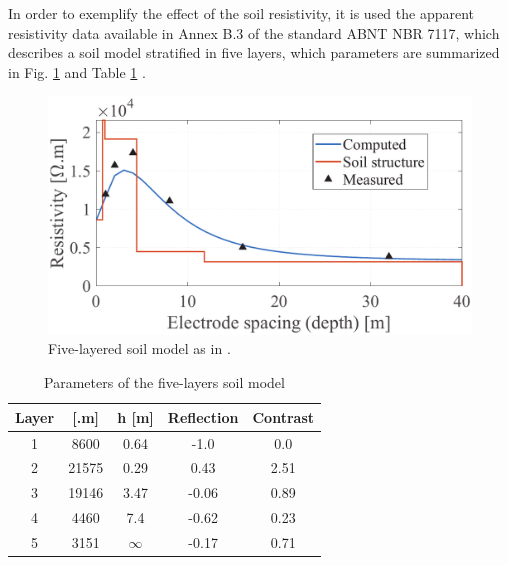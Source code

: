 \documentclass[conference]{IEEEtran}
\begin{document}
	In order to exemplify the effect of the soil resistivity, it is used the apparent resistivity data available in Annex B.3 of the standard ABNT NBR 7117, which describes a soil model stratified in five layers, which parameters are summarized in Fig. \ref{fig:SoilModel} and Table \ref{table:SoilParams} \cite{NBR7117}.
	
	\begin{figure}[hbt]
		\begin{center}
			\includegraphics[width=.8\columnwidth]{fig/soilmodel2.pdf}
			\caption{Five-layered soil model as in \cite{NBR7117}.}
			\label{fig:SoilModel}
		\end{center}
	\end{figure}
	
	\begin{table}[]
		\renewcommand{\arraystretch}{1.3}
		\caption{Parameters of the five-layers soil model}
		\label{table:SoilParams}
		\centering
		\begin{tabular}{|c|c|c|c|c|}
			\hline
			\textbf{Layer} & \textbf{\boldmath{$\rho$} {[}\boldmath{$\Omega$}.m{]}} & \textbf{h {[}m{]}} & \textbf{Reflection} & \textbf{Contrast} \\ \hline
			1     & 8600                         & 0.64              & -1.0       & 0.0      \\ \hline
			2     & 21575                        & 0.29              & 0.43       & 2.51     \\ \hline
			3     & 19146                        & 3.47              & -0.06      & 0.89     \\ \hline
			4     & 4460                         & 7.4               & -0.62      & 0.23     \\ \hline
			5     & 3151                         & $\infty$          & -0.17      & 0.71     \\ \hline
		\end{tabular}
	\end{table}
	
\end{document}
